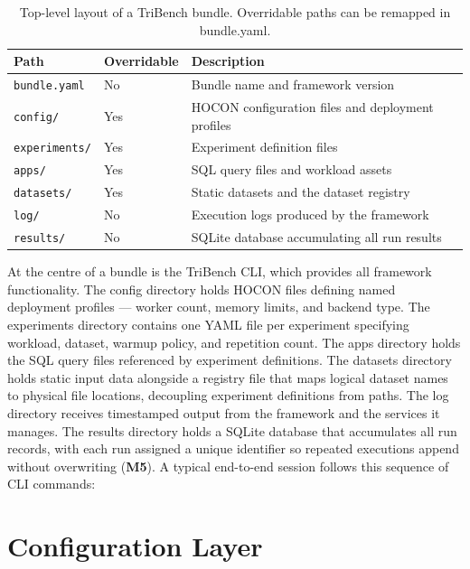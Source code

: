 \documentclass{l4proj}
\begin{document}
\begin{table}[H]
\centering
\begin{tabular}{llp{6.5cm}}
\hline
\textbf{Path} & \textbf{Overridable} & \textbf{Description} \\
\hline
\texttt{bundle.yaml}   & No  & Bundle name and framework version \\
\texttt{config/}       & Yes & HOCON configuration files and deployment profiles \\
\texttt{experiments/}  & Yes & Experiment definition files \\
\texttt{apps/}         & Yes & SQL query files and workload assets \\
\texttt{datasets/}     & Yes & Static datasets and the dataset registry \\
\texttt{log/}          & No  & Execution logs produced by the framework \\
\texttt{results/}      & No  & SQLite database accumulating all run results \\
\hline
\end{tabular}
\caption{Top-level layout of a TriBench bundle. Overridable paths can be remapped in bundle.yaml.}
\label{tab:bundle_layout}
\end{table}

At the centre of a bundle is the TriBench CLI, which provides all framework functionality. The config directory holds HOCON files defining named deployment profiles --- worker count, memory limits, and backend type. The experiments directory contains one YAML file per experiment specifying workload, dataset, warmup policy, and repetition count. The apps directory holds the SQL query files referenced by experiment definitions. The datasets directory holds static input data alongside a registry file that maps logical dataset names to physical file locations, decoupling experiment definitions from paths. The log directory receives timestamped output from the framework and the services it manages. The results directory holds a SQLite database that accumulates all run records, with each run assigned a unique identifier so repeated executions append without overwriting (\textbf{M5}). A typical end-to-end session follows this sequence of CLI commands:



\section{Configuration Layer}
\label{sec:config_layer}
\end{document}
